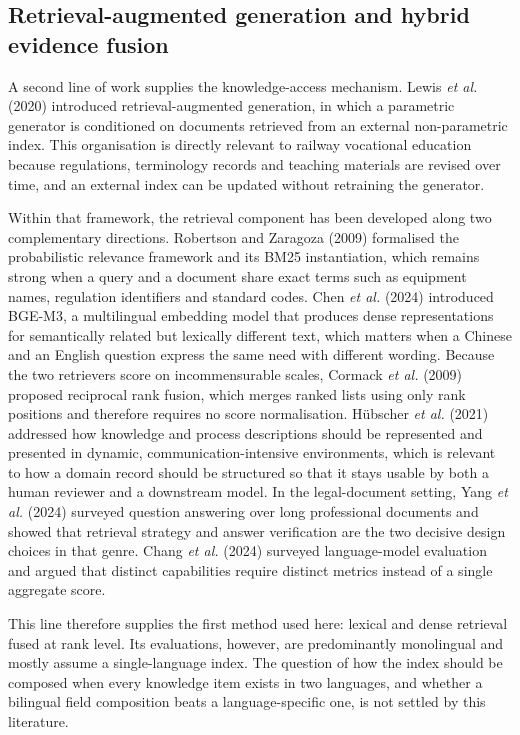 \documentclass{article}
\begin{document}
\subsection{Retrieval-augmented generation and hybrid evidence fusion}

A second line of work supplies the knowledge-access mechanism. Lewis \emph{et al.} (2020) introduced retrieval-augmented generation, in which a parametric generator is conditioned on documents retrieved from an external non-parametric index. This organisation is directly relevant to railway vocational education because regulations, terminology records and teaching materials are revised over time, and an external index can be updated without retraining the generator.

Within that framework, the retrieval component has been developed along two complementary directions. Robertson and Zaragoza (2009) formalised the probabilistic relevance framework and its BM25 instantiation, which remains strong when a query and a document share exact terms such as equipment names, regulation identifiers and standard codes. Chen \emph{et al.} (2024) introduced BGE-M3, a multilingual embedding model that produces dense representations for semantically related but lexically different text, which matters when a Chinese and an English question express the same need with different wording. Because the two retrievers score on incommensurable scales, Cormack \emph{et al.} (2009) proposed reciprocal rank fusion, which merges ranked lists using only rank positions and therefore requires no score normalisation. H\"ubscher \emph{et al.} (2021) addressed how knowledge and process descriptions should be represented and presented in dynamic, communication-intensive environments, which is relevant to how a domain record should be structured so that it stays usable by both a human reviewer and a downstream model. In the legal-document setting, Yang \emph{et al.} (2024) surveyed question answering over long professional documents and showed that retrieval strategy and answer verification are the two decisive design choices in that genre. Chang \emph{et al.} (2024) surveyed language-model evaluation and argued that distinct capabilities require distinct metrics instead of a single aggregate score.

This line therefore supplies the first method used here: lexical and dense retrieval fused at rank level. Its evaluations, however, are predominantly monolingual and mostly assume a single-language index. The question of how the index should be composed when every knowledge item exists in two languages, and whether a bilingual field composition beats a language-specific one, is not settled by this literature.
\end{document}
